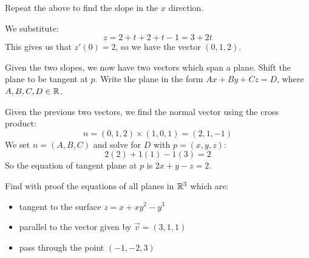 \begin{qu}[num=29.1(b)]
    Repeat the above to find the slope in the $ x $ direction.
\end{qu}

\begin{soln}
    We substitute:
    \begin{equation*}
        z = 2+t+2+t-1 = 3+2t
    \end{equation*}
    This gives us that $ z'(0) = 2 $, so we have the vector $ (0, 1, 2) $.
\end{soln}

\newpage
\begin{qu}[num=29.1(c)]
    Given the two slopes, we now have two vectors which span a plane.
    Shift the plane to be tangent at $ p $.
    Write the plane in the form $ Ax+By+Cz=D $, where $ A, B, C, D \in \mathbb{R} $.
\end{qu}

\begin{soln}
    Given the previous two vectors, we find the normal vector using the cross
    product:
    \begin{equation*}
        n = (0, 1, 2) \times (1, 0, 1) = (2, 1, -1)
    \end{equation*}
    We set $ n = (A, B, C) $ and solve for $ D $ with $ p = (x,y,z) $:
    \begin{equation*}
        2(2)+1(1)-1(3)=2
    \end{equation*}
    So the equation of tangent plane at $ p $ is $ 2x+y-z=2 $.
\end{soln}

\newpage
\begin{qu}[num=29.2]
    Find with proof the equations of all planes in $ \mathbb{R}^{3} $ which are:
    \begin{itemize}
        \item tangent to the surface $ z = x+xy^{2}-y^{3} $
        \item parallel to the vector given by $ \vec v = (3, 1, 1) $
        \item pass through the point $ (-1, -2, 3) $
    \end{itemize}
\end{qu}

